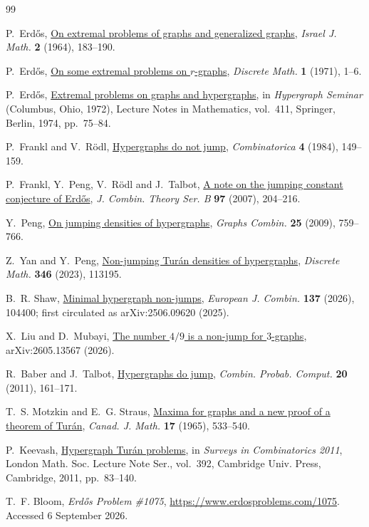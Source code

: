 \documentclass[11pt]{article}
\numberwithin{equation}{section}
\begin{document}
\begin{thebibliography}{99}

P.~Erd\H{o}s,
\href{https://users.renyi.hu/~p_erdos/1964-13.pdf}
{On extremal problems of graphs and generalized graphs},
\emph{Israel J. Math.} \textbf{2} (1964), 183--190.

P.~Erd\H{o}s,
\href{https://doi.org/10.1016/0012-365X(71)90002-1}
{On some extremal problems on \(r\)-graphs},
\emph{Discrete Math.} \textbf{1} (1971), 1--6.

P.~Erd\H{o}s,
\href{https://users.renyi.hu/~p_erdos/1974-10.pdf}
{Extremal problems on graphs and hypergraphs},
in \emph{Hypergraph Seminar} (Columbus, Ohio, 1972),
Lecture Notes in Mathematics, vol.~411,
Springer, Berlin, 1974, pp.~75--84.

P.~Frankl and V.~R\"odl,
\href{https://doi.org/10.1007/BF02579215}
{Hypergraphs do not jump},
\emph{Combinatorica} \textbf{4} (1984), 149--159.

P.~Frankl, Y.~Peng, V.~R\"odl and J.~Talbot,
\href{https://doi.org/10.1016/j.jctb.2006.05.004}
{A note on the jumping constant conjecture of Erd\H{o}s},
\emph{J. Combin. Theory Ser. B} \textbf{97} (2007), 204--216.

Y.~Peng,
\href{https://doi.org/10.1007/s00373-010-0874-4}
{On jumping densities of hypergraphs},
\emph{Graphs Combin.} \textbf{25} (2009), 759--766.

Z.~Yan and Y.~Peng,
\href{https://doi.org/10.1016/j.disc.2022.113195}
{Non-jumping Tur\'an densities of hypergraphs},
\emph{Discrete Math.} \textbf{346} (2023), 113195.

B.~R. Shaw,
\href{https://doi.org/10.1016/j.ejc.2026.104400}
{Minimal hypergraph non-jumps},
\emph{European J. Combin.} \textbf{137} (2026), 104400;
first circulated as arXiv:2506.09620 (2025).

X.~Liu and D.~Mubayi,
\href{https://arxiv.org/abs/2605.13567}
{The number \(4/9\) is a non-jump for \(3\)-graphs},
arXiv:2605.13567 (2026).

R.~Baber and J.~Talbot,
\href{https://doi.org/10.1017/S0963548310000222}
{Hypergraphs do jump},
\emph{Combin. Probab. Comput.} \textbf{20} (2011), 161--171.

T.~S. Motzkin and E.~G. Straus,
\href{https://doi.org/10.4153/CJM-1965-053-6}
{Maxima for graphs and a new proof of a theorem of Tur\'an},
\emph{Canad. J. Math.} \textbf{17} (1965), 533--540.

P.~Keevash,
\href{https://doi.org/10.1017/CBO9781139004114.004}
{Hypergraph Tur\'an problems},
in \emph{Surveys in Combinatorics 2011},
London Math. Soc. Lecture Note Ser., vol.~392,
Cambridge Univ. Press, Cambridge, 2011, pp.~83--140.

T.~F. Bloom,
\emph{Erd\H{o}s Problem \#1075},
\url{https://www.erdosproblems.com/1075}.
Accessed 6 September 2026.

\end{thebibliography}
\end{document}
